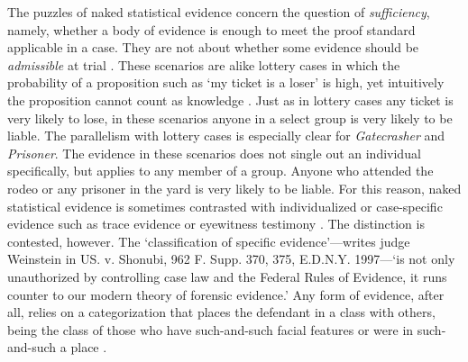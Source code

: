 \documentclass{article}
\begin{document}
The puzzles of naked statistical 
evidence concern the question of \textit{sufficiency}, namely, whether a body of evidence is enough to meet the proof standard applicable in a case. They are not about whether some evidence should be \textit{admissible} at trial \cite[on the distinction, see][]{picinali16}.
%
These scenarios are alike lottery cases in which the probability of a proposition such as `my ticket is a loser' is high,  yet intuitively the proposition cannot count as knowledge \citep[see e.g.][]{Harman1968, Nelkin2000The-Lottery-Par, hawthorne2004knowledge, Lawlor2013Assurance,  ebert2018}. 
%
Just as in lottery cases any ticket is very likely to lose,
in these scenarios anyone in a select group is very likely to be liable. 
The parallelism with lottery cases is especially clear for  \textit{Gatecrasher} and \textit{Prisoner}.
The  evidence in these scenarios
 does not single out an individual specifically, but applies to any member of a group.  Anyone who attended the rodeo or any prisoner in the yard is very likely to be liable. For this reason, naked statistical evidence is sometimes contrasted with  individualized or case-specific evidence such as trace evidence or  eyewitness testimony \citep{williams1979, Thomson86, colyvan2004}.
 The distinction is contested, however. The `classification of specific evidence'---writes 
judge Weinstein in US. v. Shonubi, 962 F. Supp. 370, 375, E.D.N.Y. 1997---`is not only unauthorized by controlling case law and the Federal Rules of Evidence, it runs counter to our modern theory of forensic evidence.' Any form of evidence, after all, relies on a categorization that places the defendant in a class with others, being the class of those  who have such-and-such facial features or  were in such-and-such a place \citep{saks80,Shauer2003Profiles-Probab, harcourt2006}. 
\end{document}
